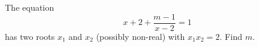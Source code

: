 The equation
\[
x+2+\dfrac{m-1}{x-2}=1
\]
has two roots $x_1$ and $x_2$ (possibly non-real) with $x_1x_2=2$. Find $m$.
